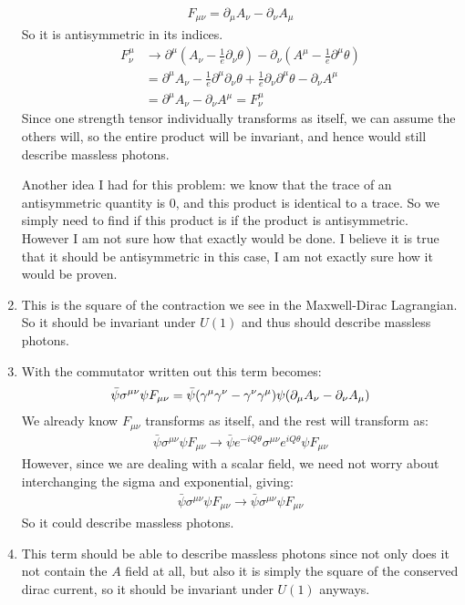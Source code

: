 \documentclass[12pt]{article}
\newcommand{\D}{\partial}
\newcommand{\munu}{{\mu\nu}}
\begin{document}
\begin{enumerate}
  \begin{align*}
    F_\munu=\D_\mu A_\nu-\D_\nu A_\mu
  \end{align*}
  So it is antisymmetric in its indices.
  \begin{align*}
    F^\mu_\nu&\to\D^\mu (A_\nu-\frac{1}{e}\D_\nu\theta)-\D_\nu
    (A^\mu-\frac{1}{e}\D^\mu\theta)\\
    &=\D^\mu A_\nu-\frac{1}{e}\D^\mu\D_\nu\theta+\frac{1}{e}\D_\nu\D^\mu\theta
    -\D_\nu A^\mu\\
    &=\D^\mu A_\nu-\D_\nu A^\mu=\boxed{F^\mu_\nu}
  \end{align*}
  Since one strength tensor individually transforms as itself, we can assume the others will, so the entire product will be invariant, and hence would still describe massless photons.

  Another idea I had for this problem: we know that the trace of an antisymmetric quantity is 0, and this product is identical to a trace. So we simply need to find if this product is if the product is antisymmetric. However I am not sure how that exactly would be done. I believe it is true that it should be antisymmetric in this case, I am not exactly sure how it would be proven. 
\item This is the square of the contraction we see in the Maxwell-Dirac Lagrangian. So it should be invariant under $U(1)$ and thus should describe massless photons. 
\item With the commutator written out this term becomes:
  \begin{align*}
    \bar{\psi}\sigma^\munu\psi F_\munu=
    \bar{\psi}\qty(\gamma^\mu\gamma^\nu-\gamma^\nu\gamma^\mu)\psi
    \qty(\D_\mu A_\nu-\D_\nu A_\mu)
  \end{align*}
  We already know $F_\munu$ transforms as itself, and the rest will transform as:
  \begin{align*}
    \bar{\psi}\sigma^\munu\psi F_\munu\to\bar{\psi}e^{-iQ\theta}
    \sigma^\munu e^{iQ\theta}\psi F_\munu
  \end{align*}
  However, since we are dealing with a scalar field, we need not worry about interchanging the sigma and exponential, giving:
  \begin{align*}
    \bar{\psi}\sigma^\munu\psi F_\munu\to\bar{\psi}
    \sigma^\munu \psi F_\munu
  \end{align*}
  So it could describe massless photons. 
\item This term should be able to describe massless photons since not only does it not contain the $A$ field at all, but also it is simply the square of the conserved dirac current, so it should be invariant under $U(1)$ anyways. 
\end{enumerate}
\end{document}
